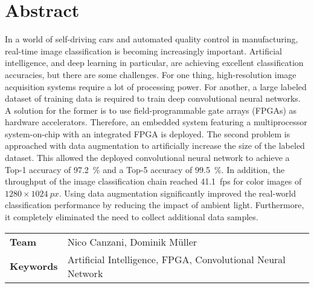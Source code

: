 \chapter*{Abstract}
In a world of self-driving cars and automated quality control in manufacturing, real-time image classification is becoming increasingly important.
Artificial intelligence, and deep learning in particular, are achieving excellent classification accuracies, but there are some challenges.
For one thing, high-resolution image acquisition systems require a lot of processing power.
For another, a large labeled dataset of training data is required to train deep convolutional neural networks.
A solution for the former is to use field-programmable gate arrays (FPGAs) as hardware accelerators.
Therefore, an embedded system featuring a multiprocessor system-on-chip with an integrated FPGA is deployed.
The second problem is approached with data augmentation to artificially increase the size of the labeled dataset.
This allowed the deployed convolutional neural network to achieve a Top-1 accuracy of \SI{97.2}{\percent} and a Top-5 accuracy of \SI{99.5}{\percent}.
In addition, the throughput of the image classification chain reached \SI{41.1}{fps} for color images of $1280\times\SI{1024}{px}$.
Using data augmentation significantly improved the real-world classification performance by reducing the impact of ambient light.
Furthermore, it completely eliminated the need to collect additional data samples.


\vspace{1cm}
\begin{tabular}{>{\bfseries}ll}
  Team  & Nico Canzani, Dominik M\"uller \\
  Keywords & Artificial Intelligence, FPGA, Convolutional Neural Network %
\end{tabular}
